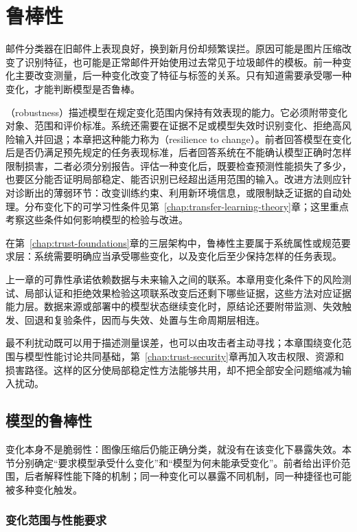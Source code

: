 \chapter{鲁棒性}
\label{chap:trust-robustness}

邮件分类器在旧邮件上表现良好，换到新月份却频繁误拦。原因可能是图片压缩改变了识别特征，也可能是正常邮件开始使用过去常见于垃圾邮件的模板。前一种变化主要改变测量，后一种变化改变了特征与标签的关系。只有知道需要承受哪一种变化，才能判断模型是否鲁棒。

（robustness）描述模型在规定变化范围内保持有效表现的能力。它必须附带变化对象、范围和评价标准。系统还需要在证据不足或模型失效时识别变化、拒绝高风险输入并回退；本章把这种能力称为（resilience to change）。前者回答模型在变化后是否仍满足预先规定的任务表现标准，后者回答系统在不能确认模型正确时怎样限制损害，二者必须分别报告。评估一种变化后，既要检查预测性能损失了多少，也要区分能否证明局部稳定、能否识别已经超出适用范围的输入。改进方法则应针对诊断出的薄弱环节：改变训练约束、利用新环境信息，或限制缺乏证据的自动处理。分布变化下的可学习性条件见第~\ref{chap:transfer-learning-theory}章；这里重点考察这些条件如何影响模型的检验与改进。

在第~\ref{chap:trust-foundations}章的三层架构中，鲁棒性主要属于系统属性或规范要求层：系统需要明确应当承受哪些变化，以及变化后至少保持怎样的任务表现。

上一章的可靠性承诺依赖数据与未来输入之间的联系。本章用变化条件下的风险测试、局部认证和拒绝效果检验这项联系改变后还剩下哪些证据，这些方法对应证据能力层。数据来源或部署中的模型状态继续变化时，原结论还要附带监测、失效触发、回退和复验条件，因而与失效、处置与生命周期层相连。

最不利扰动既可以用于描述测量误差，也可以由攻击者主动寻找；本章围绕变化范围与模型性能讨论共同基础，第~\ref{chap:trust-security}章再加入攻击权限、资源和损害路径。这样的区分使局部稳定性方法能够共用，却不把全部安全问题缩减为输入扰动。

\section{模型的鲁棒性}
\label{sec:robustness-fragility}

变化本身不是脆弱性：图像压缩后仍能正确分类，就没有在该变化下暴露失效。本节分别确定“要求模型承受什么变化”和“模型为何未能承受变化”。前者给出评价范围，后者解释性能下降的机制；同一种变化可以暴露不同机制，同一种捷径也可能被多种变化触发。

\subsection{变化范围与性能要求}
\label{sec:robustness-change-scope}

